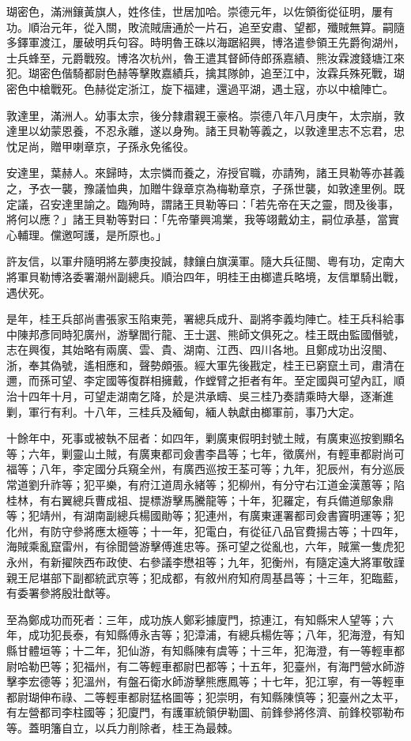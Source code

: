 \begin{pinyinscope}
瑚密色，滿洲鑲黃旗人，姓佟佳，世居加哈。崇德元年，以佐領銜從征明，屢有功。順治元年，從入關，敗流賊唐通於一片石，追至安肅、望都，殲賊無算。嗣隨多鐸軍渡江，屢破明兵句容。時明魯王硃以海踞紹興，博洛遣參領王先爵徇湖州，士兵蜂至，元爵戰歿。博洛次杭州，魯王遣其督師侍郎孫嘉績、熊汝霖渡錢塘江來犯。瑚密色偕騎都尉色赫等擊敗嘉績兵，擒其隊帥，追至江中，汝霖兵殊死戰，瑚密色中槍戰死。色赫從定浙江，旋下福建，還過平湖，遇土寇，亦以中槍陣亡。

敦達里，滿洲人。幼事太宗，後分隸肅親王豪格。崇德八年八月庚午，太宗崩，敦達里以幼蒙恩養，不忍永離，遂以身殉。諸王貝勒等義之，以敦達里志不忘君，忠忱足尚，贈甲喇章京，子孫永免徭役。

安達里，葉赫人。來歸時，太宗憐而養之，洊授官職，亦請殉，諸王貝勒等亦甚義之，予衣一襲，豫議恤典，加贈牛錄章京為梅勒章京，子孫世襲，如敦達里例。既定議，召安達里諭之。臨殉時，謂諸王貝勒等曰：「若先帝在天之靈，問及後事，將何以應？」諸王貝勒等對曰：「先帝肇興鴻業，我等翊戴幼主，嗣位承基，當實心輔理。儻邀呵護，是所原也。」

許友信，以軍弁隨明將左夢庚投誠，隸鑲白旗漢軍。隨大兵征閩、粵有功，定南大將軍貝勒博洛委署潮州副總兵。順治四年，明桂王由榔遣兵略境，友信單騎出戰，遇伏死。

是年，桂王兵部尚書張家玉陷東莞，署總兵成升、副將李義均陣亡。桂王兵科給事中陳邦彥同時犯廣州，游擊閻行龍、王士選、熊師文俱死之。桂王既由監國僭號，志在興復，其始略有兩廣、雲、貴、湖南、江西、四川各地。且鄭成功出沒閩、浙，奉其偽號，遙相應和，聲勢頗張。經大軍先後戡定，桂王已窮竄土司，肅清在邇，而孫可望、李定國等復群相擁戴，作螳臂之拒者有年。至定國與可望內訌，順治十四年十月，可望走湖南乞降，於是洪承疇、吳三桂乃奏請乘時大舉，逐漸進剿，軍行有利。十八年，三桂兵及緬甸，緬人執獻由榔軍前，事乃大定。

十餘年中，死事或被執不屈者：如四年，剿廣東假明封號土賊，有廣東巡按劉顯名等；六年，剿靈山土賊，有廣東都司僉書李昌等；七年，徵廣州，有輕車都尉尚可福等；八年，李定國分兵窺全州，有廣西巡按王荃可等；九年，犯辰州，有分巡辰常道劉升祚等；犯平樂，有府江道周永緒等；犯柳州，有分守右江道金漢蕙等；陷桂林，有右翼總兵曹成祖、提標游擊馬騰龍等；十年，犯羅定，有兵備道鄔象鼎等；犯靖州，有湖南副總兵楊國勛等；犯連州，有廣東運署都司僉書竇明運等；犯化州，有防守參將應太極等；十一年，犯電白，有從征八品官費揚古等；十四年，海賊乘亂竄雷州，有徐聞營游擊傅進忠等。孫可望之從亂也，六年，賊黨一隻虎犯永州，有新擢陜西布政使、右參議李懋祖等；九年，犯衡州，有隨定遠大將軍敬謹親王尼堪部下副都統武京等；犯成都，有敘州府知府周基昌等；十三年，犯臨藍，有委署參將殷壯猷等。

至為鄭成功而死者：三年，成功族人鄭彩據廈門，掠連江，有知縣宋人望等；六年，成功犯長泰，有知縣傅永吉等；犯漳浦，有總兵楊佐等；八年，犯海澄，有知縣甘體垣等；十二年，犯仙游，有知縣陳有虞等；十三年，犯海澄，有一等輕車都尉哈勒巴等；犯福州，有二等輕車都尉巴都等；十五年，犯臺州，有海門營水師游擊李宏德等；犯溫州，有盤石衛水師游擊熊應鳳等；十七年，犯江寧，有一等輕車都尉瑚伸布祿、二等輕車都尉猛格圖等；犯崇明，有知縣陳慎等；犯臺州之太平，有左營都司李柱國等；犯廈門，有護軍統領伊勒圖、前鋒參將佟濟、前鋒校鄂勒布等。蓋明籓自立，以兵力削除者，桂王為最棘。


\end{pinyinscope}
